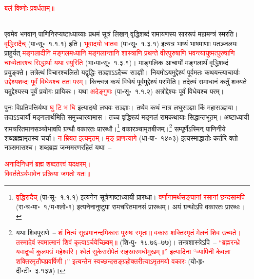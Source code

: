 \centering\textcolor{red}{बलं विष्णोः प्रवर्धताम्॥}\nopagebreak\\
\\
\begin{sloppypar}\justifying\noindent एवमेव भगवान् पाणिनिरप्यष्टाध्याय्याः प्रथमं सूत्रं लिखन् वृद्धि\-शब्दं रामायणस्य सार\-रूपं महा\-मन्त्रं स्मरति। \textcolor{red}{वृद्धिरादैच्} (पा॰सू॰~१.१.१) इति। \textcolor{red}{भूवादयो धातवः} (पा॰सू॰~१.३.१) इत्यत्र भाष्यं भाषमाणाः पतञ्जलयः प्राहुर्यत् \textcolor{red}{मङ्गलादीनि मङ्गलमध्यानि मङ्गलान्तानि शास्त्राणि प्रथन्ते वीरपुरुषाणि भवन्त्यायुष्मत्पुरुषाणि चाध्येतारश्च सिद्धार्था यथा स्युरिति} (भा॰पा॰सू॰~१.३.१)। माङ्गलिक आचार्यो मङ्गलार्थं वृद्धिशब्दं प्रयुङ्क्ते। तत्रेत्थं विचारश्चलितो यद्वृद्धिः सञ्ज्ञाऽऽदैच्च सञ्ज्ञी। नियमोऽयमुद्देश्यं पूर्वमतः कथयन्त्याचार्याः \textcolor{red}{उद्देश्य\-शब्दः पूर्वं विधेयश्च ततः परम्}। किन्त्वत्र कथं विधेयं पूर्वमुद्देश्यं परमिति। तदेत्थं समाधानं कर्तुं शक्यते यदुद्देश्यस्य पूर्वं प्रयोगः प्रायिकः। यथा \textcolor{red}{अदेङ्गुणः} (पा॰सू॰~१.१.२) अत्रोद्देश्यः पूर्वं विधेयश्च परम्।\end{sloppypar}
\begin{sloppypar}\justifying\noindent\hspace{10mm} पुनः विप्रतिपत्तिर्यथा \textcolor{red}{घु टि भ घि} इत्यादयो लघवः सञ्ज्ञाः। तथैव कथं नात्र लघु\-सञ्ज्ञा किं महा\-सञ्ज्ञया। तदाऽऽचार्यो मङ्गलार्थमिति समुच्चारयामास। तच्च वृद्धिरूपं मङ्गलं रामकथायाः सिद्धान्त\-भूतम्। अष्टाध्यायी राम\-चरित\-मानसञ्चोभावपि ग्रन्थौ वकारतः प्रारब्धौ।\footnote{\textcolor{red}{वृद्धिरादैच्} (पा॰सू॰~१.१.१) इत्यनेन सूत्रेणाष्टाध्यायी प्रारब्धा। \textcolor{red}{वर्णानामर्थ\-सङ्घानां रसानां छन्दसामपि} (रा॰च॰मा॰~१/म॰श्लो॰१) इत्यनेनानुष्टुपा रामचरितमानसं प्रारब्धम्। अयं ग्रन्थोऽपि वकारतः प्रारब्धः।} वकारञ्चामृत\-बीजम्।\footnote{यथा शिवपुराणे~– \textcolor{red}{शं नित्यं सुखमानन्दमिकारः पुरुषः स्मृतः॥ वकारः शक्तिरमृतं मेलनं शिव उच्यते। तस्मादेवं स्वमात्मानं शिवं कृत्वाऽर्चयेच्छिवम्॥} (शि॰पु॰~१८.७६–७७)। तन्त्रशास्त्रेऽपि~– \textcolor{red}{“ब्रह्मरन्ध्रे यवादूर्ध्वं कुलपद्मं महेश्वरि। श्वेतं सुकेसरोपेतं सहस्रारमधोमुखम्॥” इत्यादिना “व्यापिनी केवला शक्तिरमृतौघप्रवर्षिणी।” इत्यन्तेन स्वच्छन्द\-सङ्ग्रहोक्त\-रीत्याऽमृतमयो वकारः} (यो॰हृ॰ दी॰टी॰~३.१३७)।} सम्पूर्णेऽस्मिन् पाणिनीये शब्द\-ब्रह्मामृतस्य चर्चा। \textcolor{red}{न म्रियत इत्यमृतम्}। \textcolor{red}{मृङ् प्राण\-त्यागे} (धा॰पा॰~१४०३) इत्यस्माद्धातोः कर्तरि क्तो नञ्समासश्च। शब्द\-ब्रह्म जन्म\-मरण\-रहितं यथा~–\end{sloppypar}
\centering\textcolor{red}{अनादिनिधनं ब्रह्म शब्दतत्त्वं यदक्षरम्।\nopagebreak\\
विवर्ततेऽर्थभावेन प्रक्रिया जगतो यतः॥}\nopagebreak\\
